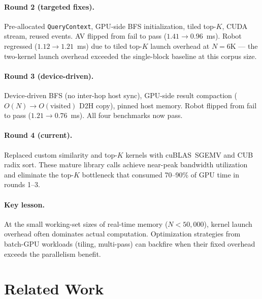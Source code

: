 \documentclass[11pt]{article}
\begin{document}
\paragraph{Round 2 (targeted fixes).} Pre-allocated \texttt{QueryContext},
GPU-side BFS initialization, tiled top-$K$, CUDA stream, reused events.
AV flipped from fail to pass ($1.41 \to 0.96$~ms). Robot regressed
($1.12 \to 1.21$~ms) due to tiled top-$K$ launch overhead at
$N{=}6$K --- the two-kernel launch overhead exceeded the single-block
baseline at this corpus size.

\paragraph{Round 3 (device-driven).} Device-driven BFS (no inter-hop host
sync), GPU-side result compaction ($O(N) \to O(\text{visited})$ D2H
copy), pinned host memory. Robot flipped from fail to pass
($1.21 \to 0.76$~ms). All four benchmarks now pass.

\paragraph{Round 4 (current).} Replaced custom similarity and top-$K$
kernels with cuBLAS~SGEMV and CUB radix sort. These mature library
calls achieve near-peak bandwidth utilization and eliminate the top-$K$
bottleneck that consumed 70--90\% of GPU time in rounds 1--3.

\paragraph{Key lesson.} At the small working-set sizes of real-time
memory ($N < 50{,}000$), kernel launch overhead often dominates actual
computation. Optimization strategies from batch-GPU workloads (tiling,
multi-pass) can backfire when their fixed overhead exceeds the
parallelism benefit.

\section{Related Work}
\label{sec:related}
\end{document}
